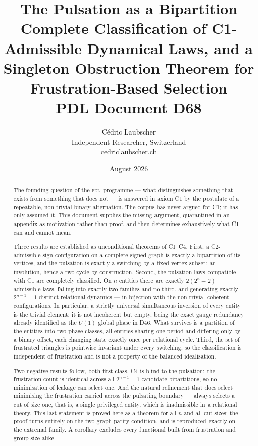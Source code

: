 \documentclass[11pt,a4paper]{article}
\title{\textbf{The Pulsation as a Bipartition}\texorpdfstring{\\[4pt]\large Complete Classification of C1-Admissible Dynamical Laws, and a Singleton Obstruction Theorem for Frustration-Based Selection}{: Complete Classification of C1-Admissible Dynamical Laws, and a Singleton Obstruction Theorem for Frustration-Based Selection}\\[6pt]
{\large PDL Document D68}}
\author{C\'edric Laubscher\\[4pt]
\small Independent Researcher, Switzerland\\
\small \href{https://cedriclaubscher.ch}{cedriclaubscher.ch}}
\date{August 2026}
\def\mathrm#1{#1}%
\newcommand{\PDL}{\textsc{pdl}}
\begin{document}
\maketitle

\begin{abstract}
The founding question of the \PDL\ programme --- what distinguishes something that exists from something that does not --- is answered in axiom C1 by the postulate of a repeatable, non-trivial binary alternation. The corpus has never argued for C1; it has only assumed it. This document supplies the missing argument, quarantined in an appendix as motivation rather than proof, and then determines exhaustively what C1 can and cannot mean.

Three results are established as unconditional theorems of C1--C4. First, a C2-admissible sign configuration on a complete signed graph is exactly a bipartition of its vertices, and the pulsation is exactly a switching by a fixed vertex subset: an involution, hence a two-cycle by construction. Second, the pulsation laws compatible with C1 are completely classified. On $n$ entities there are exactly $2(2^n-2)$ admissible laws, falling into exactly two families and no third, and generating exactly $2^{n-1}-1$ distinct relational dynamics --- in bijection with the non-trivial coherent configurations. In particular, a strictly universal simultaneous inversion of every entity is the trivial element: it is not incoherent but empty, being the exact gauge redundancy already identified as the $\mathrm{U}(1)$ global phase in D46. What survives is a partition of the entities into two phase classes, all entities sharing one period and differing only by a binary offset, each changing state exactly once per relational cycle. Third, the set of frustrated triangles is pointwise invariant under every switching, so the classification is independent of frustration and is not a property of the balanced idealisation.

Two negative results follow, both first-class. C4 is blind to the pulsation: the frustration count is identical across all $2^{n-1}-1$ candidate bipartitions, so no minimisation of leakage can select one. And the natural refinement that does select --- minimising the frustration carried across the pulsating boundary --- always selects a cut of size one, that is, a single privileged entity, which is inadmissible in a relational theory. This last statement is proved here as a theorem for all $n$ and all cut sizes; the proof turns entirely on the two-graph parity condition, and is reproduced exactly on the extremal family. A corollary excludes every functional built from frustration and group size alike.


\end{abstract}
\end{document}
